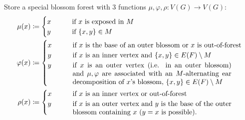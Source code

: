\documentclass[11pt, a4paper]{article}
\newcommand{\set}[1]{\{#1\}}
\theoremstyle{remark}
\theoremstyle{definition}
\begin{document}
Store a special blossom forest with 3 functions $\mu,\varphi,\rho:
	V(G)\to V(G)$:
\begin{align*}
	\mu(x)     & \coloneqq \begin{cases}
		                       x \qquad & \text{if $x$ is exposed in $M$} \\
		                       y \qquad & \text{if $\set{x,y}\in M$}
	                       \end{cases}                                                                       \\
	\varphi(x) & \coloneqq\begin{cases}
		                      x \qquad & \text{if $x$ is the base of an outer blossom or
		                      $x$ is out-of-forest}                                                                     \\
		                      y \qquad & \text{if $x$ is an inner vertex and
		                      $\set{x,y}\in E(F)\setminus M$}                                                           \\
		                      y \qquad & \text{\parbox[t]{8cm}{if $x$ is an outer vertex (i.e. in an outer blossom) and
				                      $\mu,\varphi$ are associated with an $M$-alternating ear
				                      decomposition of $x$'s blossom, $\set{x,y}\in E(F)\setminus M$}}
	                      \end{cases} \\
	\rho(x)    & \coloneqq\begin{cases}
		                      x \qquad & \text{if $x$ is an inner vertex or out-of-forest}                          \\
		                      y \qquad & \text{\parbox[t]{8cm}{if $x$ is an outer vertex and $y$ is the base of the
				                      outer blossom containing $x$ ($y=x$ is possible).}}
	                      \end{cases}
\end{align*}
\end{document}

